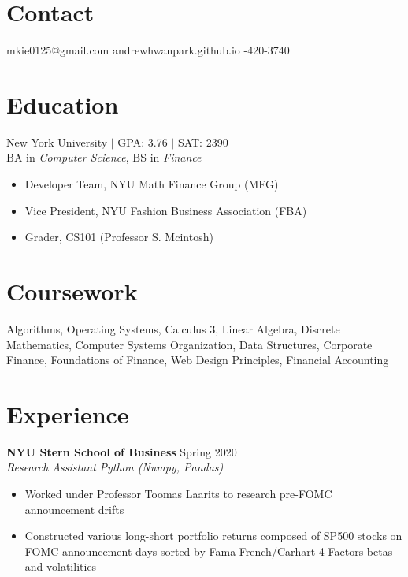 \documentclass[margin]{res}
\begin{document}
 
 
 
\begin{resume} 
 
\section{Contact} 
mkie0125@gmail.com \quad\quad\quad andrewhwanpark.github.io \quad\quad{}-420-3740

\section{Education} 
New York University $\vert$ GPA: 3.76 $\vert$ SAT: 2390 \\
BA in {\it Computer Science}, BS in {\it Finance} 

 \begin{itemize} \itemsep -2pt  %
 \item Developer Team, NYU Math Finance Group (MFG)
 \item Vice President, NYU Fashion Business Association (FBA)
 \item Grader, CS101 (Professor S. Mcintosh)
 \end{itemize}

\section{Coursework}
Algorithms, Operating Systems, Calculus 3, Linear Algebra, Discrete Mathematics, Computer Systems Organization, Data Structures, Corporate Finance, Foundations of Finance, Web Design Principles, Financial Accounting

\section{Experience}
{\bf NYU Stern School of Business} \hfill Spring 2020\\
{\it Research Assistant} \hfill {\it Python (Numpy, Pandas)}
 \begin{itemize} \itemsep -2pt  %
 \item Worked under Professor Toomas Laarits to research pre-FOMC announcement drifts
 \item Constructed various long-short portfolio returns composed of SP500 stocks on FOMC announcement days sorted by Fama French/Carhart 4 Factors betas and volatilities
 \end{itemize}


\end{resume}
\end{document}
